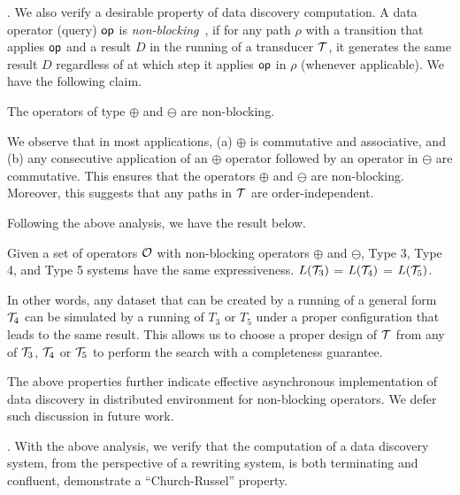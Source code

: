 {. 
We also verify a desirable property 
of data discovery computation. 
A data operator (query) ${\mathsf{op}}$ is 
{\em non-blocking}~\cite{law2004query},   
if for any path $\rho$ with a transition 
that applies ${\mathsf{op}}$ and a result $D$ in the running of a transducer ${\mathcal T}$,  
it generates the same result $D$
regardless of at which step 
it applies ${\mathsf{op}}$ in $\rho$ 
(whenever applicable). 
We have the following claim. 

\begin{lemma}
\label{prop-non-blocking}
The operators of type $\oplus$ and 
$\ominus$ are non-blocking. %
\end{lemma}

We observe 
that in most applications, 
(a) $\oplus$ is commutative 
and associative, and 
(b) any consecutive application of an $\oplus$ operator followed by an operator in  
$\ominus$ are commutative. 
This ensures that the 
operators $\oplus$ and $\ominus$ 
are non-blocking. Moreover, 
this suggests that 
any paths  
in ${\mathcal T}$ are order-independent. 

Following the above analysis, we 
have the result below. 

\begin{proposition}
\label{prop-equivalent}
Given a set of operators ${\mathcal O}$ with non-blocking 
operators $\oplus$ and $\ominus$,  
Type 3, Type 4, and Type 5 systems 
have the same expressiveness. 
\ie $L({\mathcal T}_3)$ = $L({\mathcal T}_4)$ = 
$L({\mathcal T}_5)$. 
\end{proposition}

In other words, any dataset 
that can be created by a 
running of a general 
form ${\mathcal T}_4$ can be simulated by 
a running of $T_3$ or $T_5$ 
under a proper   
configuration that leads to 
the same result. 
This allows us to 
choose a proper 
design of ${\mathcal T}$ from 
any of ${\mathcal T}_3$, ${\mathcal T}_4$ 
or ${\mathcal T}_5$ to perform the 
search with a completeness 
guarantee. 

The above properties further indicate effective asynchronous implementation 
of data discovery in distributed 
environment for non-blocking 
operators. We defer 
such discussion in future work. 

. 
With the above analysis, we verify that the 
computation of a data discovery system, 
from the perspective of a rewriting system, 
is both terminating and confluent, 
\ie demonstrate a ``Church-Russel'' property. 

}
